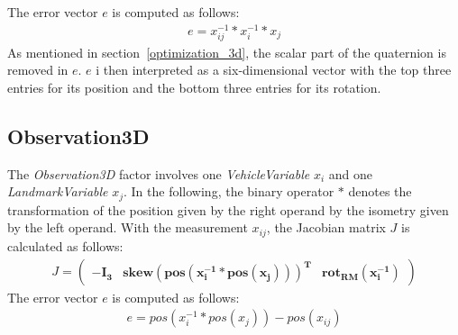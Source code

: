 The error vector $e$ is computed as follows:
\begin{align}
	e = x_{ij}^{-1} * x_i^{-1} * x_j
\end{align}
As mentioned in section~\ref{optimization_3d}, the scalar part of the quaternion is removed in $e$. $e$ i then interpreted as a six-dimensional vector with the top three entries for its position and the bottom three entries for its rotation.



\subsection{Observation3D}
The \textit{Observation3D} factor involves one \textit{VehicleVariable} $x_i$ and one \textit{LandmarkVariable} $x_j$. In the following, the binary operator $*$ denotes the transformation of the position given by the right operand by the isometry given by the left operand. With the measurement $x_{ij}$, the Jacobian matrix $J$ is calculated as follows:
\begin{align}
	J =
	\begin{pmatrix}
		\boldsymbol{-I_3} & \boldsymbol{skew(pos(x_i^{-1} * pos(x_j)))^T} & \boldsymbol{rot_{RM}(x_i^{-1})}
	\end{pmatrix}
\end{align}
The error vector $e$ is computed as follows:
\begin{align}
	e = pos(x_i^{-1} * pos(x_j)) - pos(x_{ij})
\end{align}